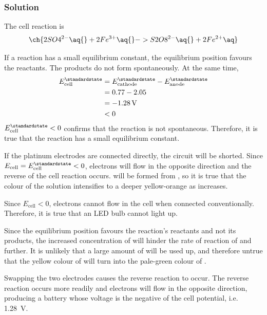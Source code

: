 \subsubsection{Solution}
The cell reaction  is
\begin{equation*}
	\ch{2 SO4^{2-} \aq{} + 2 Fe^{3+} \aq{} -> S2O8^{2-} \aq{} + 2 Fe^{2+} \aq}
\end{equation*}

If a reaction has a small equilibrium constant, the equilibrium position favours
the reactants. The products do not form spontaneously. At the same time,
\begin{align*}
	E^\standardstate_\text{cell} & = E^\standardstate_\text{cathode} - E^\standardstate_\text{anode} \\
	                             & = 0.77 - 2.05                                                     \\
	                             & = \qty{-1.28}{\volt}                                              \\
	                             & < 0
\end{align*}
\(E^\standardstate_\text{cell} < 0\) confirms that the reaction is not spontaneous.
Therefore, it is {\color{accent} true} that the reaction has a small equilibrium
constant.

If the platinum electrodes are connected directly, the circuit will be shorted.
Since \(E_\text{cell} = E^\standardstate_\text{cell} < 0\), electrons will flow
in the opposite direction and the reverse of the cell reaction occurs. 
will be formed from , so it is {\color{accent} true} that the colour of the solution
intensifies to a deeper yellow-orange as \ch{[Fe^{3+}]} increases.

Since \(E_\text{cell} < 0\), electrons cannot flow in the cell when connected
conventionally. Therefore, it is {\color{accent} true} that an LED bulb cannot
light up.

Since the equilibrium position favours the reaction's reactants and not its
products, the increased concentration of  will hinder
the rate of reaction of  and  further.
It is unlikely that a large amount of  will be used up, and
therefore {\color{accent} untrue} that the yellow colour of 
will turn into the pale-green colour of .

Swapping the two electrodes causes the reverse reaction to occur. The reverse
reaction occurs more readily and electrons will flow in the opposite direction,
producing a battery whose voltage is the negative of the cell potential, i.e.
\qty{1.28}{\volt}.

